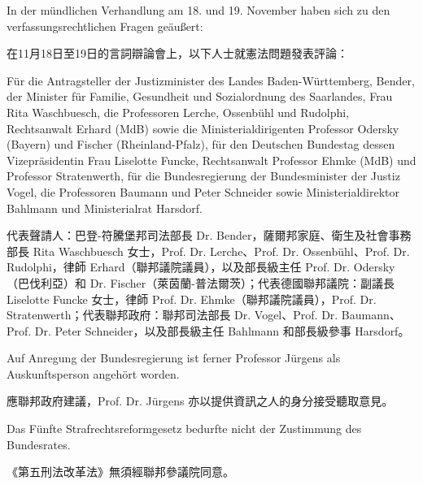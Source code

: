 \documentclass[12pt]{article}
\begin{document}
\syncleft
\begin{sourcepara}
In der mündlichen Verhandlung am 18. und 19. November haben sich zu den verfassungsrechtlichen Fragen geäußert:
\end{sourcepara}
\begin{transpara}
在11月18日至19日的言詞辯論會上，以下人士就憲法問題發表評論：
\end{transpara}

\syncleft
\begin{sourcepara}
Für die Antragsteller der Justizminister des Landes Baden-Württemberg, \abbrDr{} Bender, der Minister für Familie, Gesundheit und Sozialordnung des Saarlandes, Frau Rita Waschbuesch, die Professoren \abbrDr{} Lerche, \abbrDr{} Ossenbühl und \abbrDr{} Rudolphi, Rechtsanwalt Erhard (MdB) sowie die Ministerialdirigenten Professor \abbrDr{} Odersky (Bayern) und \abbrDr{} Fischer (Rheinland-Pfalz), für den Deutschen Bundestag dessen Vizepräsidentin Frau Liselotte Funcke, Rechtsanwalt Professor \abbrDr{} Ehmke (MdB) und Professor \abbrDr{} Stratenwerth, für die Bundesregierung der Bundesminister der Justiz \abbrDr{} Vogel, die Professoren \abbrDr{} Baumann und \abbrDr{} Peter Schneider sowie Ministerialdirektor Bahlmann und Ministerialrat Harsdorf.
\end{sourcepara}
\begin{transpara}
代表聲請人：巴登-符騰堡邦司法部長 Dr. Bender，薩爾邦家庭、衛生及社會事務部長 Rita Waschbuesch 女士，Prof. Dr. Lerche、Prof. Dr. Ossenbühl、Prof. Dr. Rudolphi，律師 Erhard（聯邦議院議員），以及部長級主任 Prof. Dr. Odersky（巴伐利亞）和 Dr. Fischer（萊茵蘭-普法爾茨）；代表德國聯邦議院：副議長 Liselotte Funcke 女士，律師 Prof. Dr. Ehmke（聯邦議院議員），Prof. Dr. Stratenwerth；代表聯邦政府：聯邦司法部長 Dr. Vogel、Prof. Dr. Baumann、Prof. Dr. Peter Schneider，以及部長級主任 Bahlmann 和部長級參事 Harsdorf。
\end{transpara}

\syncleft
\begin{sourcepara}
Auf Anregung der Bundesregierung ist ferner Professor \abbrDr{}\abbrDr{} Jürgens als Auskunftsperson angehört worden.
\end{sourcepara}
\begin{transpara}
應聯邦政府建議，Prof. Dr. Jürgens 亦以提供資訊之人的身分接受聽取意見。
\end{transpara}

\syncleft
\begin{sourcepara}
Das Fünfte Strafrechtsreformgesetz bedurfte nicht der Zustimmung des Bundesrates.
\end{sourcepara}
\begin{transpara}
《第五刑法改革法》無須經聯邦參議院同意。
\end{transpara}
\end{document}
